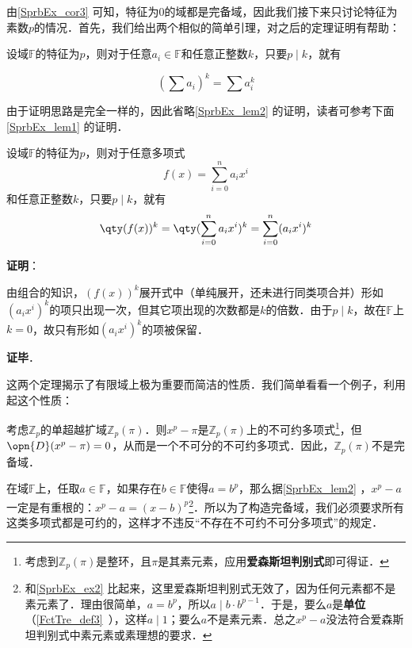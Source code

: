 由\autoref{SprbEx_cor3} 可知，特征为$0$的域都是完备域，因此我们接下来只讨论特征为素数$p$的情况．首先，我们给出两个相似的简单引理，对之后的定理证明有帮助：


\begin{lemma}{}\label{SprbEx_lem2}
设域$\mathbb{F}$的特征为$p$，则对于任意$a_i\in\mathbb{F}$和任意正整数$k$，只要$p\mid k$，就有

\begin{equation}
(\sum a_i)^k = \sum a_i^k
\end{equation}

\end{lemma}

由于证明思路是完全一样的，因此省略\autoref{SprbEx_lem2} 的证明，读者可参考下面\autoref{SprbEx_lem1} 的证明．


\begin{lemma}{}\label{SprbEx_lem1}
设域$\mathbb{F}$的特征为$p$，则对于任意多项式
\begin{equation}
f(x) = \sum_{i=0}^n a_ix^i
\end{equation}
和任意正整数$k$，只要$p\mid k$，就有
\begin{equation}
\qty(f(x))^k = \qty(\sum_{i=0}^n a_ix^i)^k = \sum_{i=0}^n (a_ix^i)^k
\end{equation}
\end{lemma}

\textbf{证明}：

由组合的知识，$(f(x))^k$展开式中（单纯展开，还未进行同类项合并）形如$(a_ix^i)^k$的项只出现一次，但其它项出现的次数都是$k$的倍数．由于$p\mid k$，故在$\mathbb{F}$上$k=0$，故只有形如$(a_ix^i)^k$的项被保留．

\textbf{证毕}．


这两个定理揭示了有限域上极为重要而简洁的性质．我们简单看看一个例子，利用起这个性质：




\begin{example}{}\label{SprbEx_ex2}
考虑$\mathbb{Z}_p$的单超越扩域$\mathbb{Z}_p(\pi)$．则$x^p-\pi$是$\mathbb{Z}_p(\pi)$上的不可约多项式\footnote{考虑到$\mathbb{Z}_p(\pi)$是整环，且$\pi$是其素元素，应用\textbf{爱森斯坦判别式}即可得证．}，但$\opn{D}(x^p-\pi)=0$，从而是一个不可分的不可约多项式．因此，$\mathbb{Z}_p(\pi)$不是完备域．

\end{example}



在域$\mathbb{F}$上，任取$a\in\mathbb{F}$，如果存在$b\in\mathbb{F}$使得$a=b^p$，那么据\autoref{SprbEx_lem2} ，$x^p-a$一定是有重根的：$x^p-a=(x-b)^p$\footnote{和\autoref{SprbEx_ex2} 比起来，这里爱森斯坦判别式无效了，因为任何元素都不是素元素了．理由很简单，$a=b^p$，所以$a\mid b\cdot b^{p-1}$．于是，要么$a$是\textbf{单位}（\autoref{FctTre_def3}~），这样$a\mid 1$；要么$a$不是素元素．总之$x^p-a$没法符合爱森斯坦判别式中素元素或素理想的要求．}．所以为了构造完备域，我们必须要求所有这类多项式都是可约的，这样才不违反“不存在不可约不可分多项式”的规定．

